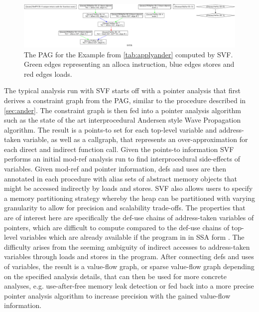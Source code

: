 \begin{figure}
    \centering
    \includegraphics[width=1.\textwidth]{img/pag.png}
    \caption[An example PAG as produced by SVF]{The PAG for the Example from \autoref{tab:applyander} computed by SVF.
        Green edges representing an alloca instruction, blue edges stores and red edges loads.}
    \label{fig:pag}
\end{figure}

The typical analysis run with SVF starts off with a pointer analysis that first derives a constraint graph from the PAG, similar to the procedure described in \autoref{sec:ander}.
The constraint graph is then fed into a pointer analysis algorithm such as the state of the art interprocedural Andersen style Wave Propagation algorithm.
The result is a points-to set for each top-level variable and address-taken variable, as well as a callgraph, that represents an over-approximation for each direct and indirect function call.
Given the points-to information SVF performs an initial mod-ref analysis run to find interprocedural side-effects of variables. Given mod-ref and pointer information, defs and uses are then annotated in each procedure with alias sets of abstract memory objects that might be accessed indirectly by loads and stores.
SVF also allows users to specify a memory partitioning strategy whereby the heap can be partitioned with varying granularity to allow for precision and scalability trade-offs.
The properties that are of interest here are specifically the def-use chains of address-taken variables of pointers, which are difficult to compute compared to the def-use chains of top-level variables which are already available if the program in in SSA form \cite{sui2016svf}.
The difficulty arises from the seeming ambiguity of indirect accesses to address-taken variables through loads and stores in the program.
After connecting defs and uses of variables, the result is a value-flow graph, or sparse value-flow graph depending on the specified analysis details, that can then be used for more concrete analyses, e.g. use-after-free memory leak detection \cite{sui2014detecting} or fed back into a more precise pointer analysis algorithm to increase precision with the gained value-flow information.

